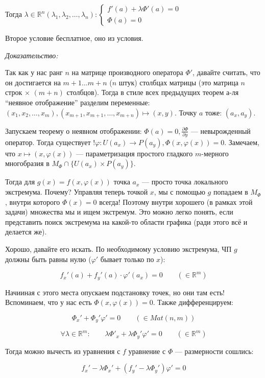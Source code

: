 \documentclass{article}
\def\dbl{\,\,}
\begin{document}
Тогда $\lambda \in \mathbb{R}^n (\lambda_1, \lambda_2, \ldots, \lambda_n): \begin{cases}
    f'(a) + \lambda\Phi'(a) = 0 \\
    \Phi(a) = 0
\end{cases}$

Второе условие бесплатное, оно из условия.

\textit{Доказательство:}

Так как у нас ранг $n$ на матрице производного оператора $\Phi'$, давайте считать, что он достигается на $m + 1 \ldots m + n$ ($n$ штук) столбцах матрицы (это матрица $n$ строк $\times \dbl (m + n)$ столбцов). Тогда в стиле всех предыдущих теорем а-ля ``неявное отображение'' разделим переменные: $(x_1, x_2, \ldots, x_m), (x_{m + 1}, x_{m + 1}, \ldots, x_{m + n}) \mapsto (x, y)$. Точку $a$ тоже: $(a_x, a_y)$. 

Запускаем теорему о неявном отображении: $\Phi(a) = 0, \frac{\partial \Phi}{\partial y}$ --- невырожденный оператор. Тогда существует $! \varphi: U(a_x) \rightarrow P(a_y), \Phi(x, \varphi(x)) = 0$. Замечаем, что $x \mapsto (x, \varphi(x))$ --- параметризация простого гладкого $m$-мерного многобразия в $M_\Phi \cap \{U(a_x) \times P(a_y)\}$.

Тогда для $g(x) = f(x, \varphi(x))$ точка $a_x$ --- просто точка локального экстремума. Почему? Управляя теперь точкой $x$, мы с помощью $g$ попадаем в $M_\Phi$, внутри которого $\Phi(x) = 0$ всегда! Поэтому внутри хорошего (в рамках этой задачи) множества мы и ищем экстремум. Это можно легко понять, если представить поиск экстремума на какой-то области графика (ради этого всё и делается же).

Хорошо, давайте его искать. По необходимому условию экстремума, ЧП $g$ должны быть равны нулю ($\varphi'$ бывает только по $x$):

\[f_x'(a) + f_y'(a)\cdot\varphi'(a_x) = 0 \qquad (\in \mathbb{R}^m)\]

Начииная с этого места опускаем подстановку точек, но они там есть! Вспоминаем, что у нас есть $\Phi(x, \varphi(x)) = 0$. Также дифференцируем: 

\[\Phi_x' + \Phi_y'\varphi' = 0 \qquad (\in Mat(n, m))\]

\[\forall \lambda \in \mathbb{R}^m: \qquad \lambda\Phi'_x + \lambda\Phi_y'\varphi' = 0 \qquad (\in \mathbb{R}^m)\]

Тогда можно вычесть из уравнения с $f$ уравнение с $\Phi$ --- размерности сошлись:

\[f_x' - \lambda\Phi_x' + (f_y' - \lambda\Phi_y')\varphi' = 0\]
\end{document}

